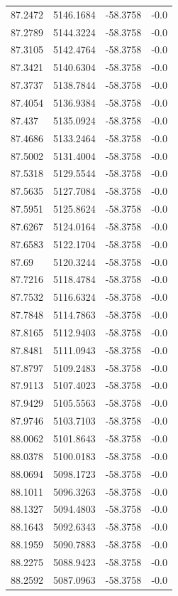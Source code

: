\begin{table}[H]
\begin{tabular}{llll}
87.2472 & 5146.1684 & -58.3758 & -0.0 \\
87.2789 & 5144.3224 & -58.3758 & -0.0 \\
87.3105 & 5142.4764 & -58.3758 & -0.0 \\
87.3421 & 5140.6304 & -58.3758 & -0.0 \\
87.3737 & 5138.7844 & -58.3758 & -0.0 \\
87.4054 & 5136.9384 & -58.3758 & -0.0 \\
87.437 & 5135.0924 & -58.3758 & -0.0 \\
87.4686 & 5133.2464 & -58.3758 & -0.0 \\
87.5002 & 5131.4004 & -58.3758 & -0.0 \\
87.5318 & 5129.5544 & -58.3758 & -0.0 \\
87.5635 & 5127.7084 & -58.3758 & -0.0 \\
87.5951 & 5125.8624 & -58.3758 & -0.0 \\
87.6267 & 5124.0164 & -58.3758 & -0.0 \\
87.6583 & 5122.1704 & -58.3758 & -0.0 \\
87.69 & 5120.3244 & -58.3758 & -0.0 \\
87.7216 & 5118.4784 & -58.3758 & -0.0 \\
87.7532 & 5116.6324 & -58.3758 & -0.0 \\
87.7848 & 5114.7863 & -58.3758 & -0.0 \\
87.8165 & 5112.9403 & -58.3758 & -0.0 \\
87.8481 & 5111.0943 & -58.3758 & -0.0 \\
87.8797 & 5109.2483 & -58.3758 & -0.0 \\
87.9113 & 5107.4023 & -58.3758 & -0.0 \\
87.9429 & 5105.5563 & -58.3758 & -0.0 \\
87.9746 & 5103.7103 & -58.3758 & -0.0 \\
88.0062 & 5101.8643 & -58.3758 & -0.0 \\
88.0378 & 5100.0183 & -58.3758 & -0.0 \\
88.0694 & 5098.1723 & -58.3758 & -0.0 \\
88.1011 & 5096.3263 & -58.3758 & -0.0 \\
88.1327 & 5094.4803 & -58.3758 & -0.0 \\
88.1643 & 5092.6343 & -58.3758 & -0.0 \\
88.1959 & 5090.7883 & -58.3758 & -0.0 \\
88.2275 & 5088.9423 & -58.3758 & -0.0 \\
88.2592 & 5087.0963 & -58.3758 & -0.0 \\

\end{tabular}
\end{table}
